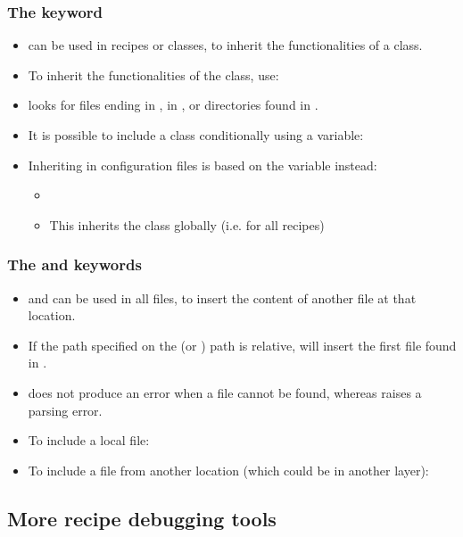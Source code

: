 \begin{frame}
  \frametitle{The  keyword}
  \begin{itemize}
    \item {} can be used in recipes or classes, to inherit
      the functionalities of a class.
    \item To inherit the functionalities of the  class,
      use: 
    \item {} looks for files ending in , in
      ,  or  directories
      found in .
    \item It is possible to include a class conditionally using a
      variable: 
    \item Inheriting in configuration files is based on the 
      variable instead:
      \begin{itemize}
        \item {}
        \item This inherits the class globally (i.e. for all recipes)
      \end{itemize}
  \end{itemize}
\end{frame}

\begin{frame}
  \frametitle{The  and  keywords}
  \begin{itemize}
    \item {} and  can be used in all files,
      to insert the content of another file at that location.
    \item If the path specified on the  (or
      ) path is relative,  will insert the first
      file found in .
    \item {} does not produce an error when a file cannot
      be found, whereas  raises a parsing error.
    \item To include a local file: 
    \item To include a file from another location (which could be
      in another layer): 
  \end{itemize}
\end{frame}

\subsection{More recipe debugging tools}

